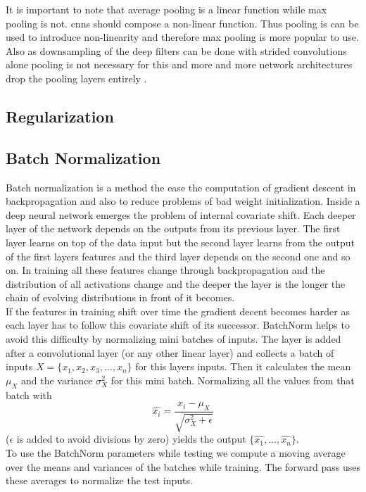 It is important to note that average pooling is a linear function while max pooling is not. \glspl{cnn} should compose a non-linear function. Thus pooling is can be used to introduce non-linearity and therefore max pooling is more popular to use. Also as downsampling of the deep filters can be done with strided convolutions alone pooling is not necessary for this and more and more network architectures drop the pooling layers entirely \citep{springenberg_striving_2014}.

\subsection{Regularization} %
\label{sub:conepts:nn:regularization}

\subsection{Batch Normalization} %
\label{sub:conepts:nn:batchnorm}
Batch normalization \citep{ioffe_batch_2015} is a method the ease the computation of gradient descent in backpropagation and also to reduce problems of bad weight initialization. Inside a deep neural network emerges the problem of internal covariate shift. Each deeper layer of the network depends on the outputs from its previous layer. The first layer learns on top of the data input but the second layer learns from the output of the first layers features and the third layer depends on the second one and so on. In training all these features change through backpropagation and the distribution of all activations change and the deeper the layer is the longer the chain of evolving distributions in front of it becomes.\\
If the features in training shift over time the gradient decent becomes harder as each layer has to follow this covariate shift of its successor. BatchNorm helps to avoid this difficulty by normalizing mini batches of inputs. The layer is added after a convolutional layer (or any other linear layer) and collects a batch of inputs $X = \{x_1, x_2, x_3, \dots, x_n\}$ for this layers inputs. Then it calculates the mean $\mu_X$ and the variance $\sigma_X^2$ for this mini batch. Normalizing all the values from that batch  with
\begin{equation}
    \hat{x_i} = \frac{x_i - \mu_X}{\sqrt{\sigma_X^2 + \epsilon}}
\end{equation}
($\epsilon$ is added to avoid divisions by zero) yields the output $\{\hat{x_1},\dots,\hat{x_n}\}$.\\
To use the BatchNorm parameters while testing we compute a moving average over the means and variances of the batches while training. The forward pass uses these averages to normalize the test inputs.


